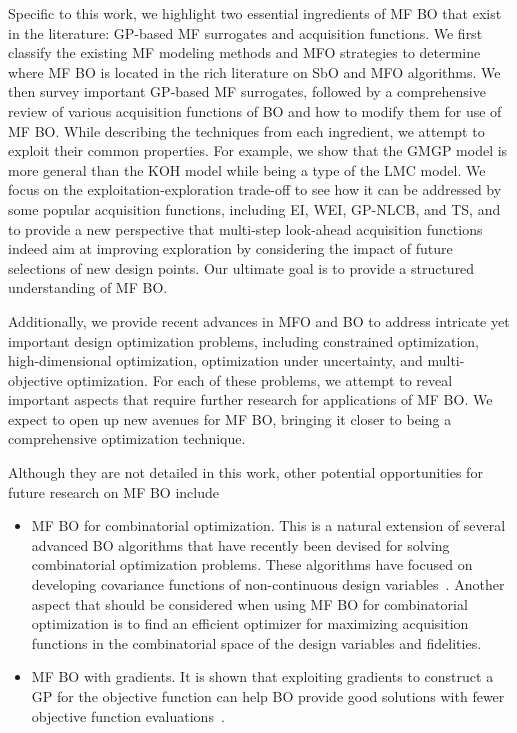 \documentclass[journal ]{new-aiaa}
\begin{document}
Specific to this work, we highlight two essential ingredients of MF BO that exist in the literature: GP-based MF surrogates and acquisition functions.
We first classify the existing MF modeling methods and MFO strategies to determine where MF BO is located in the rich literature on SbO and MFO algorithms.
We then survey important GP-based MF surrogates, followed by a comprehensive review of various acquisition functions of BO and how to modify them for use of MF BO.  
While describing the techniques from each ingredient, we attempt to exploit their common properties.
For example, we show that the GMGP model is more general than the KOH model while being a type of the LMC model.
We focus on the exploitation-exploration trade-off to see how it can be addressed by some popular acquisition functions, including EI, WEI, GP-NLCB, and TS, and to provide a new perspective that multi-step look-ahead acquisition functions indeed aim at improving exploration by considering the impact of future selections of new design points.  
Our ultimate goal is to provide a structured understanding of MF BO.

Additionally, we provide recent advances in MFO and BO to address intricate yet important design optimization problems, including constrained optimization, high-dimensional optimization, optimization under uncertainty, and multi-objective optimization.
For each of these problems, we attempt to reveal important aspects that require further research for applications of MF BO.
We expect to open up new avenues for MF BO, bringing it closer to being a comprehensive optimization technique.

Although they are not detailed in this work, other potential opportunities for future research on MF BO include    
\begin{itemize}
	\item MF BO for combinatorial optimization. This is a natural extension of several advanced BO algorithms that have recently been devised for solving combinatorial optimization problems. These algorithms have focused on developing covariance functions of non-continuous design variables~\citep[see e.g.,][]{GomezBombarelli2018,GarridoMerchan2020,ZhangYi2020,Vangelatos2021}. Another aspect that should be considered when using MF BO for combinatorial optimization is to find an efficient optimizer for maximizing acquisition functions in the combinatorial space of the design variables and fidelities.
	
	\item MF BO with gradients. It is shown that exploiting gradients to construct a GP for the objective function can help BO provide good solutions with fewer objective function evaluations~\citep{WuJ2017}.
\end{itemize}
\end{document}
